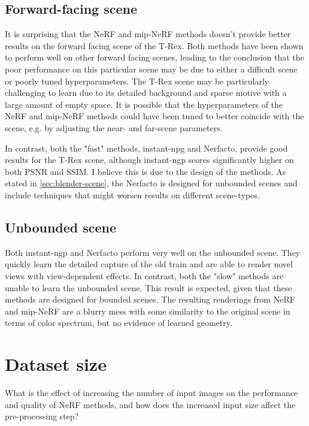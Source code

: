 \subsection{Forward-facing scene}
It is surprising that the NeRF and mip-NeRF methods doesn't provide better results on the forward facing scene of the T-Rex. Both methods have been shown to perform well on other forward facing scenes, leading to the conclusion that the poor performance on this particular scene may be due to either a difficult scene or poorly tuned hyperparameters. The T-Rex scene may be particularly challenging to learn due to its detailed background and sparse motive with a large amount of empty space. It is possible that the hyperparameters of the NeRF and mip-NeRF methods could have been tuned to better coincide with the scene, e.g. by adjusting the near- and far-scene parameters.

In contrast, both the "fast" methods, instant-npg and Nerfacto, provide good results for the T-Rex scene, although instant-ngp scores significantly higher on both PSNR and SSIM. I believe this is due to the design of the methods. As stated in \autoref{sec:blender-scene}, the Nerfacto is designed for unbounded scenes and include techniques that might worsen results on different scene-types.

\subsection{Unbounded scene}
Both instant-ngp and Nerfacto perform very well on the unbounded scene. They quickly learn the detailed capture of the old train and are able to render novel views with view-dependent effects. In contrast, both the "slow" methods are unable to learn the unbounded scene. This result is expected, given that these methods are designed for bounded scenes. The resulting renderings from NeRF and mip-NeRF are a blurry mess with some similarity to the original scene in terms of color spectrum, but no evidence of learned geometry.

\section{Dataset size}
\begin{description}[leftmargin=!,labelwidth=\widthof{RQ 1:}]
\item[\textbf{RQ 2:}]
What is the effect of increasing the number of input images on the performance and quality of NeRF methods, and how does the increased input size affect the pre-processing step?
\end{description}

